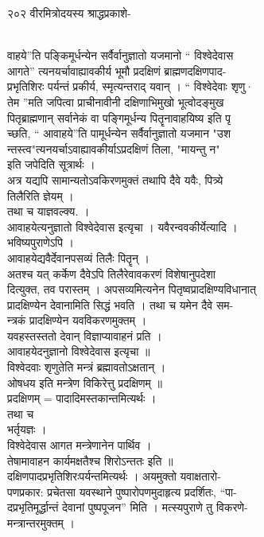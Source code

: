 \documentclass[11pt, openany]{book}
\begin{document}
{{{{{{{{{२०२ वीरमित्रोदयस्य श्राद्धप्रकाशे-}{\\
वाहये''ति पङ्किमूर्धन्येन सर्वैर्वानुज्ञातो यजमानो `` विश्वेदेवास\\
आगते'' त्यनयर्चावाह्यावकीर्य भूमौ प्रदक्षिणं ब्राह्मणदक्षिणपाद-\\
प्रभृतिशिरः पर्यन्तं प्रकीर्य, स्मृत्यन्तराद् यवान् । `` विश्वेदेवाः
शृणु·\\
तेम ''मति जपित्वा प्राचीनावीनी दक्षिणाभिमुखो भूत्वोदङ्मुख\\
पितृब्राह्मणान् सर्वानेकं वा पङ्गिमूर्धन्य पितॄनावाहयिष्य इति पृ\\
च्छति, `` आवाहये''ति पामूर्धन्येन सर्वैर्वानुज्ञातो यजमान "उश\\
न्तस्त्व"त्यनयर्चाऽवाह्यावकीर्याऽप्रदक्षिणं तिला, "मायन्तु न"\\
इति जपेदिति सूत्रार्थः ।\\
अत्र यद्यपि सामान्यतोऽवकिरणमुक्तं तथापि दैवे यवैः, पित्र्ये\\
तिलैरिति ज्ञेयम् ।\\
तथा च याज्ञवल्क्य. ।\\
आवाहयेत्यनुज्ञातो विश्वेदेवास इत्यृचा । यवैरन्ववकीर्येत्यादि ।\\
भविष्यपुराणेऽपि ।\\
आवाहयेद्यवैर्देवानपसव्यं तिलैः पितॄन् ।\\
अतश्च यत् कर्केण दैवेऽपि तिलैरेवावकरणं विशेषानुपदेशा\\
दित्युक्त, तव परास्तम् । अपसव्यमित्यनेन पितृष्वप्रादक्षिण्यविधानात्\\
प्रादक्षिण्येन देवानामिति सिद्धं भवति । तथा च यमेन दैवे सम-\\
न्त्रकं प्रादक्षिण्येन यवविकरणमुक्तम् ।\\
यवहस्तस्ततो देवान् विज्ञाप्यावाहनं प्रति ।\\
आवाहयेदनुज्ञानो विश्वेदेवास इत्यृचा ॥\\
विश्वेदवाः शृणुतेति मन्त्रं ब्रह्मावतोऽक्षतान् ।\\
ओषधय इति मन्त्रेण विकिरेत्तु प्रदक्षिणम् ॥\\
प्रदक्षिणम् = पादादिमस्तकान्तमित्यर्थः ।\\
तथा च\\
भर्तृयज्ञः ।\\
विश्वेदेवास आगत मन्त्रेणानेन पार्थिव ।\\
तेषामावाहन कार्यमक्षतैश्च शिरोऽन्ततः इति ॥\\
दक्षिणपादप्रभृतिशिरःपर्यन्तमित्यर्थः । अयमुक्तो यवाक्षतारो-\\
पणप्रकार: प्रचेतसा यवस्थाने पुष्पारोपणमुदाहृत्य प्रदर्शितः, ``पा-\\
दप्रभृतिमूर्द्धान्तं देवानां पुष्पपूजन'' मिति । मत्स्यपुराणे तु
विकरणे-\\
मन्त्रान्तरमुक्तम् ।

}}}}}}}}}
\end{document}
